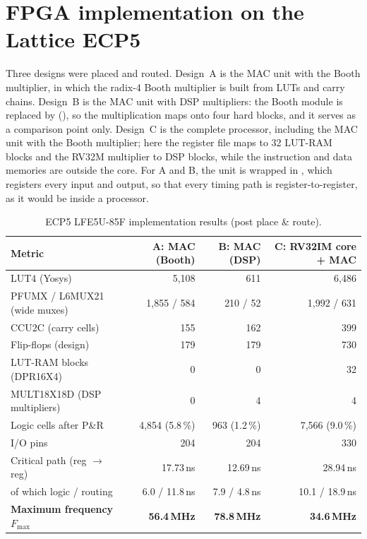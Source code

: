 \section{FPGA implementation on the Lattice ECP5}
Three designs were placed and routed. Design~A is the MAC unit with the Booth
multiplier, in which the radix-4 Booth multiplier is built from LUTs and carry
chains. Design~B is the MAC unit with DSP multipliers: the Booth module is
replaced by  (\code{*}), so the
multiplication maps onto four hard  blocks, and it serves as
a comparison point only. Design~C is the complete processor, 
including the MAC unit with the Booth multiplier; here the register file maps
to 32 LUT-RAM blocks and the RV32M multiplier to DSP blocks, while the
instruction and data memories are outside the core.
For A and B, the unit is wrapped in , which
registers every input and output, so that every timing path is
register-to-register, as it would be inside a processor.

\begin{table}[H]
  \centering
  \caption{ECP5 LFE5U-85F implementation results (post place \& route).}
  \label{tab:ecp5}
  \small
  \begin{tabular}{@{}lrrr@{}}
    \toprule
    Metric & A: MAC (Booth) & B: MAC (DSP) & C: RV32IM core + MAC \\
    \midrule
    LUT4 (Yosys)                     & 5{,}108 & 611 & 6{,}486 \\
    PFUMX / L6MUX21 (wide muxes)     & 1{,}855 / 584 & 210 / 52 & 1{,}992 / 631 \\
    CCU2C (carry cells)              & 155 & 162 & 399 \\
    Flip-flops (design)              & 179 & 179 & 730 \\
    LUT-RAM blocks (DPR16X4)         & 0 & 0 & 32 \\
    MULT18X18D (DSP multipliers)     & 0 & 4 & 4 \\
    Logic cells after P\&R           & 4{,}854 (5.8\,\%) & 963 (1.2\,\%) & 7{,}566 (9.0\,\%) \\
    I/O pins                         & 204 & 204 & 330 \\
    \midrule
    Critical path (reg $\rightarrow$ reg) & 17.73\,ns & 12.69\,ns & 28.94\,ns \\
    \quad of which logic / routing   & 6.0 / 11.8\,ns & 7.9 / 4.8\,ns & 10.1 / 18.9\,ns \\
    \textbf{Maximum frequency $F_{\max}$} & \textbf{56.4\,MHz} & \textbf{78.8\,MHz} & \textbf{34.6\,MHz} \\
    \bottomrule
  \end{tabular}
\end{table}

